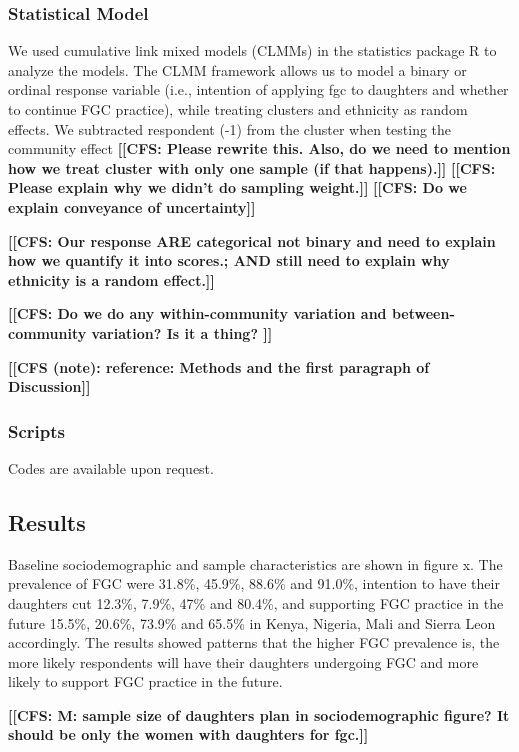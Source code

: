 \documentclass[12pt,]{article}
\newcommand{\comment}[1]{\textbf{[[#1]]}}
\newcommand{\cfcmt}[1]{\comment{CFS: #1}}
\newcommand{\cfonly}[1]{\comment{CFS (note): #1}}
\begin{document}
\subsubsection{Statistical Model}\label{statistical-model}

We used cumulative link mixed models (CLMMs) in the statistics package R \cite{Rstats,Rpackage_ordinal} to analyze the models.  The CLMM framework allows us to model a binary or ordinal response variable (i.e., intention of applying fgc to daughters and whether to continue FGC practice), while treating clusters and ethnicity as random effects.  
We subtracted respondent (-1) from the cluster when testing the community effect \cfcmt{Please rewrite this. Also, do we need to mention how we treat cluster with only one sample (if that happens).}
\cfcmt{Please explain why we didn’t do sampling weight.}
\cfcmt{Do we explain conveyance of uncertainty}

\cfcmt{Our response ARE categorical not binary and need to explain how we quantify it into scores.; AND still need to explain why ethnicity is a random effect.}

\cfcmt{Do we do any within-community variation and between-community variation?  Is it a thing?
}

\cfonly{reference: Methods and the first paragraph of Discussion\cite{Chia14}}


\subsubsection{Scripts}\label{scripts}

Codes are available upon request. 

\subsection{Results}\label{results-1}

Baseline sociodemographic and sample characteristics are shown in figure x.  The prevalence of FGC were 31.8\%, 45.9\%, 88.6\% and 91.0\%, intention to have their daughters cut 12.3\%, 7.9\%, 47\% and 80.4\%, and supporting FGC practice in the future 15.5\%, 20.6\%, 73.9\% and 65.5\% in Kenya, Nigeria, Mali and Sierra Leon accordingly.  The results showed patterns that the higher FGC prevalence is, the more likely respondents will have their daughters undergoing FGC and more likely to support FGC practice in the future.  

\cfcmt{M: sample size of daughters plan in sociodemographic figure?  It should be only the women with daughters for fgc.}
\end{document}
